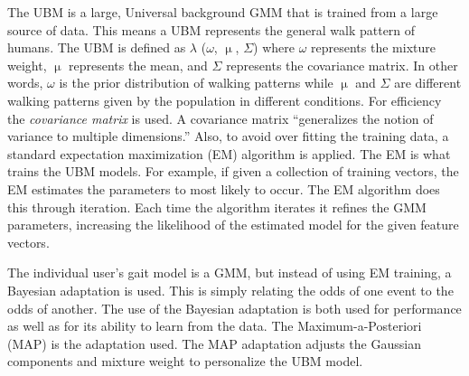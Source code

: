 \documentclass{sig-alternate}
\begin{document}
	 The UBM is a large, Universal background GMM that is trained from a large source of data. This means a UBM represents the general walk pattern of humans. The UBM is defined as 
\begin{math} \lambda \end{math} (\begin{math} \omega \end{math},
\begin{math} \upmu \end{math},
\begin{math} \Sigma \end{math}) where
\begin{math} \omega \end{math} represents the mixture weight, \begin{math} \upmu \end{math} represents the mean, and \begin{math} \Sigma \end{math} represents the covariance matrix. In other words, \begin{math} \omega \end{math} is the prior distribution of walking patterns while \begin{math} \upmu \end{math} and \begin{math} \Sigma \end{math} are different walking patterns given by the population in different conditions. For efficiency the \textit{covariance matrix} is used. A covariance matrix ``generalizes the notion of variance to multiple dimensions.'' Also, to avoid over fitting the training data, a standard expectation maximization (EM) algorithm is applied. The EM is what trains the UBM models. For example, if given a collection of training vectors, the EM estimates the parameters to most likely to occur. The EM algorithm does this through iteration. Each time the algorithm iterates it refines the GMM parameters, increasing the likelihood of the estimated model for the given feature vectors. 

	The individual user's gait model is a GMM, but instead of using EM training, a Bayesian adaptation is used. This is simply relating the odds of one event to the odds of another. The use of the Bayesian adaptation is both used for performance as well as for its ability to learn from the data. The Maximum-a-Posteriori (MAP) is the adaptation used. The MAP adaptation adjusts the Gaussian components and mixture weight to personalize the UBM model. 
	
\end{document}
